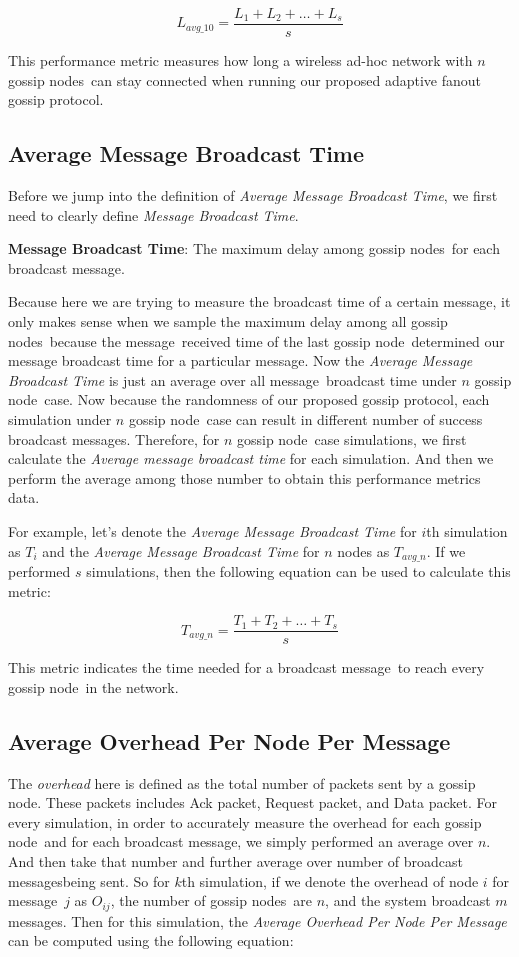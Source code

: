 \documentclass[onehalf,11pt]{beavtex}
\newcommand{\gp}{gossip protocol}
\newcommand{\msgs}{messages}
\newcommand{\msg}{message}
\newcommand{\gn}{gossip node}
\newcommand{\gns}{gossip nodes}
\begin{document}
\[ L_{avg\_10} =\frac{L_1 + L_2 + \ldots + L_{s}}{s} \]

This performance metric measures how long a wireless ad-hoc network with $n$ \gns ~can stay connected when running our proposed adaptive fanout \gp.

\subsection{Average Message Broadcast Time}

Before we jump into the definition of \emph{Average Message Broadcast Time}, we first need to clearly define \emph{Message Broadcast Time}.

\textbf{Message Broadcast Time}: The maximum delay among \gns ~for each broadcast \msg.

Because here we are trying to measure the broadcast time of a certain \msg, it only makes sense when we sample the maximum delay among all \gns ~because the \msg ~received time of the last \gn ~determined our message broadcast time for a particular \msg. Now the \emph{Average Message Broadcast Time} is just an average over all \msg ~broadcast time under $n$ \gn ~case. Now because the randomness of our proposed \gp, each simulation under $n$ \gn ~case can result in different number of success broadcast \msgs. Therefore, for $n$ \gn ~case simulations, we first calculate the \emph{Average message broadcast time} for each simulation. And then we perform the average among those number to obtain this performance metrics data.

For example, let's denote the \emph{Average Message Broadcast Time} for $i$th simulation as $T_i$ and the \emph{Average Message Broadcast Time} for $n$ nodes as $T_{avg\_n}$. If we performed $s$ simulations, then the following equation can be used to calculate this metric:

\[ T_{avg\_n} = \frac{T_1 + T_2 + \ldots + T_s}{s} \]

This metric indicates the time needed for a broadcast \msg ~to reach every \gn ~in the network.

\subsection{Average Overhead Per Node Per Message}

The \emph{overhead} here is defined as the total number of packets sent by a \gn. These packets includes Ack packet, Request packet, and Data packet. For every simulation, in order to accurately measure the overhead for each \gn ~and for each broadcast \msg, we simply performed an average over $n$. And then take that number and further average over number of broadcast \msgs being sent. So for $k$th simulation, if we denote the overhead of node $i$ for \msg ~$j$ as $O_{ij}$, the number of \gns ~are $n$, and the system broadcast $m$ \msgs. Then for this simulation, the \emph{Average Overhead Per Node Per Message} can be computed using the following equation:
\end{document}
